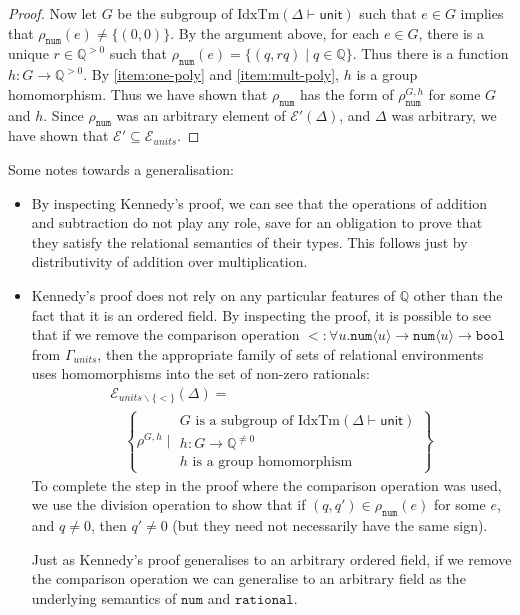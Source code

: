 \documentclass[natbib,preprint]{sigplanconf}
\newcommand{\sepbar}{\mathrel|}
\newcommand{\idxTms}[2]{\mathrm{IdxTm}(#1 \vdash #2)}
\newcommand{\tyPrim}[2]{\texttt{#1}\langle #2 \rangle}
\newcommand{\tyPrimNm}[1]{\texttt{#1}}
\newcommand{\relEnv}[1]{\mathcal{#1}}
\begin{document}
\begin{proof}
  Now let $G$ be the subgroup of $\idxTms{\Delta}{\mathsf{unit}}$ such
  that $e \in G$ implies that $\rho_{\tyPrimNm{num}}(e) \not=
  \{(0,0)\}$. By the argument above, for each $e \in G$, there is a
  unique $r \in \mathbb{Q}^{>0}$ such that $\rho_{\tyPrimNm{num}}(e) =
  \{ (q,rq) \sepbar q \in \mathbb{Q} \}$. Thus there is a function $h
  : G \to \mathbb{Q}^{>0}$. By \ref{item:one-poly} and
  \ref{item:mult-poly}, $h$ is a group homomorphism. Thus we have
  shown that $\rho_{\tyPrimNm{num}}$ has the form of
  $\rho^{G,h}_{\tyPrimNm{num}}$ for some $G$ and $h$. Since
  $\rho_{\tyPrimNm{num}}$ was an arbitrary element of
  $\relEnv{E}'(\Delta)$, and $\Delta$ was arbitrary, we have shown
  that $\relEnv{E}' \subseteq \relEnv{E}_{\mathit{units}}$.
\end{proof}

Some notes towards a generalisation:
\begin{itemize}
\item By inspecting Kennedy's proof, we can see that the operations of
  addition and subtraction do not play any role, save for an
  obligation to prove that they satisfy the relational semantics of
  their types. This follows just by distributivity of addition over
  multiplication.
\item Kennedy's proof does not rely on any particular features of
  $\mathbb{Q}$ other than the fact that it is an ordered field. By
  inspecting the proof, it is possible to see that if we remove the
  comparison operation $< : \forall u. \tyPrim{num}{u} \to
  \tyPrim{num}{u} \to \tyPrimNm{bool}$ from $\Gamma_{\mathit{units}}$,
  then the appropriate family of sets of relational environments uses
  homomorphisms into the set of non-zero rationals:
  \begin{displaymath}
    \begin{array}{l}
      \relEnv{E}_{\mathit{units}\backslash\{<\}}(\Delta) = \\
      \quad\left\{ \rho^{G,h} \sepbar
        \begin{array}{l}
          G\textrm{ is a subgroup of }\idxTms{\Delta}{\mathsf{unit}} \\
          h : G \to \mathbb{Q}^{\not=0} \\
          h\textrm{ is a group homomorphism}
        \end{array}
      \right\}
    \end{array}
  \end{displaymath}
  To complete the step in the proof where the comparison operation was
  used, we use the division operation to show that if $(q,q') \in
  \rho_{\tyPrimNm{num}}(e)$ for some $e$, and $q \not= 0$, then $q'
  \not= 0$ (but they need not necessarily have the same sign).

  Just as Kennedy's proof generalises to an arbitrary ordered field,
  if we remove the comparison operation we can generalise to an
  arbitrary field as the underlying semantics of $\tyPrimNm{num}$ and
  $\tyPrimNm{rational}$.
\end{itemize}
\end{document}
